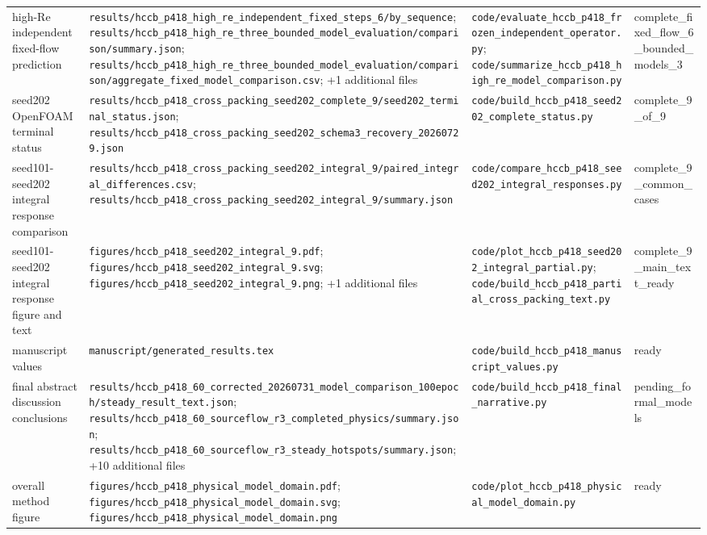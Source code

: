 \begin{longtable}{>{\raggedright\arraybackslash}p{2.8cm}>{\raggedright\arraybackslash}p{6.6cm}>{\raggedright\arraybackslash}p{6.4cm}>{\raggedright\arraybackslash}p{2.4cm}}
high-Re independent fixed-flow prediction & \nolinkurl{results/hccb_p418_high_re_independent_fixed_steps_6/by_sequence}; \nolinkurl{results/hccb_p418_high_re_three_bounded_model_evaluation/comparison/summary.json}; \nolinkurl{results/hccb_p418_high_re_three_bounded_model_evaluation/comparison/aggregate_fixed_model_comparison.csv}; +1 additional files & \nolinkurl{code/evaluate_hccb_p418_frozen_independent_operator.py}; \nolinkurl{code/summarize_hccb_p418_high_re_model_comparison.py} & complete\_\allowbreak{}fixed\_\allowbreak{}flow\_\allowbreak{}6\_\allowbreak{}bounded\_\allowbreak{}models\_\allowbreak{}3 \\
seed202 OpenFOAM terminal status & \nolinkurl{results/hccb_p418_cross_packing_seed202_complete_9/seed202_terminal_status.json}; \nolinkurl{results/hccb_p418_cross_packing_seed202_schema3_recovery_20260729.json} & \nolinkurl{code/build_hccb_p418_seed202_complete_status.py} & complete\_\allowbreak{}9\_\allowbreak{}of\_\allowbreak{}9 \\
seed101-seed202 integral response comparison & \nolinkurl{results/hccb_p418_cross_packing_seed202_integral_9/paired_integral_differences.csv}; \nolinkurl{results/hccb_p418_cross_packing_seed202_integral_9/summary.json} & \nolinkurl{code/compare_hccb_p418_seed202_integral_responses.py} & complete\_\allowbreak{}9\_\allowbreak{}common\_\allowbreak{}cases \\
seed101-seed202 integral response figure and text & \nolinkurl{figures/hccb_p418_seed202_integral_9.pdf}; \nolinkurl{figures/hccb_p418_seed202_integral_9.svg}; \nolinkurl{figures/hccb_p418_seed202_integral_9.png}; +1 additional files & \nolinkurl{code/plot_hccb_p418_seed202_integral_partial.py}; \nolinkurl{code/build_hccb_p418_partial_cross_packing_text.py} & complete\_\allowbreak{}9\_\allowbreak{}main\_\allowbreak{}text\_\allowbreak{}ready \\
manuscript values & \nolinkurl{manuscript/generated_results.tex} & \nolinkurl{code/build_hccb_p418_manuscript_values.py} & ready \\
final abstract discussion conclusions & \nolinkurl{results/hccb_p418_60_corrected_20260731_model_comparison_100epoch/steady_result_text.json}; \nolinkurl{results/hccb_p418_60_sourceflow_r3_completed_physics/summary.json}; \nolinkurl{results/hccb_p418_60_sourceflow_r3_steady_hotspots/summary.json}; +10 additional files & \nolinkurl{code/build_hccb_p418_final_narrative.py} & pending\_\allowbreak{}formal\_\allowbreak{}models \\
overall method figure & \nolinkurl{figures/hccb_p418_physical_model_domain.pdf}; \nolinkurl{figures/hccb_p418_physical_model_domain.svg}; \nolinkurl{figures/hccb_p418_physical_model_domain.png} & \nolinkurl{code/plot_hccb_p418_physical_model_domain.py} & ready \\

\end{longtable}
